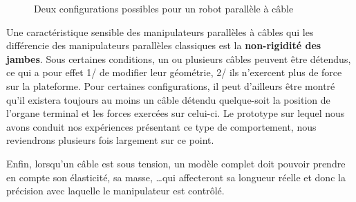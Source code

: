 \begin{figure}[!ht]
  \centering
       \hfill
    \caption{\footnotesize Deux configurations possibles pour un robot parallèle à câble}
\label{intro:fig5}
\end{figure}

Une caractéristique sensible des manipulateurs parallèles à câbles qui les différencie des manipulateurs parallèles classiques est la {\bf non-rigidité des jambes}. Sous certaines conditions, un ou plusieurs câbles peuvent être détendus, ce qui a pour effet 1/ de modifier leur géométrie, 2/ ils n'exercent plus de force sur la plateforme. Pour certaines configurations, il peut d'ailleurs être montré qu'il existera toujours au moins un câble détendu quelque-soit la position de l'organe terminal et les forces exercées sur celui-ci. Le prototype sur lequel nous avons conduit nos expériences présentant ce type de comportement, nous reviendrons plusieurs fois largement sur ce point.

Enfin, lorsqu'un câble est sous tension, un modèle complet doit pouvoir prendre en compte son élasticité, sa masse, \dots qui affecteront sa longueur réelle et donc la précision avec laquelle le manipulateur est contrôlé.

